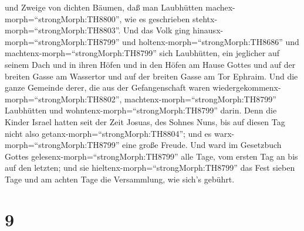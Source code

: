 und Zweige von dichten Bäumen, daß man Laubhütten
machex-morph=``strongMorph:TH8800'', wie es geschrieben
stehtx-morph=``strongMorph:TH8803''.  Und das Volk ging
hinausx-morph=``strongMorph:TH8799'' und
holtenx-morph=``strongMorph:TH8686'' und
machtenx-morph=``strongMorph:TH8799'' sich Laubhütten, ein jeglicher auf
seinem Dach und in ihren Höfen und in den Höfen am Hause Gottes und auf
der breiten Gasse am Wassertor und auf der breiten Gasse am Tor Ephraim.
 Und die ganze Gemeinde derer, die aus der Gefangenschaft
waren wiedergekommenx-morph=``strongMorph:TH8802'',
machtenx-morph=``strongMorph:TH8799'' Laubhütten und
wohntenx-morph=``strongMorph:TH8799'' darin. Denn die Kinder Israel
hatten seit der Zeit Josuas, des Sohnes Nuns, bis auf diesen Tag nicht
also getanx-morph=``strongMorph:TH8804''; und es
warx-morph=``strongMorph:TH8799'' eine große Freude.  Und
ward im Gesetzbuch Gottes gelesenx-morph=``strongMorph:TH8799'' alle
Tage, vom ersten Tag an bis auf den letzten; und sie
hieltenx-morph=``strongMorph:TH8799'' das Fest sieben Tage und am achten
Tage die Versammlung, wie sich's gebührt.

\hypertarget{section-8}{%
\section{9}\label{section-8}}

